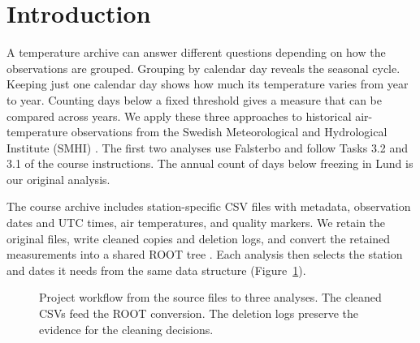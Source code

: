 \section{Introduction}
A temperature archive can answer different questions depending on how the observations are grouped. Grouping by calendar day reveals the seasonal cycle. Keeping just one calendar day shows how much its temperature varies from year to year. Counting days below a fixed threshold gives a measure that can be compared across years. We apply these three approaches to historical air-temperature observations from the Swedish Meteorological and Hydrological Institute (SMHI) \cite{smhi,instructions}. The first two analyses use Falsterbo and follow Tasks 3.2 and 3.1 of the course instructions. The annual count of days below freezing in Lund is our original analysis.

The course archive includes station-specific CSV files with metadata, observation dates and UTC times, air temperatures, and quality markers. We retain the original files, write cleaned copies and deletion logs, and convert the retained measurements into a shared ROOT tree \cite{root,repo}. Each analysis then selects the station and dates it needs from the same data structure (Figure~\ref{fig:workflow}).

\begin{figure}[htbp]
\centering
{}
\caption{Project workflow from the source files to three analyses. The cleaned CSVs feed the ROOT conversion. The deletion logs preserve the evidence for the cleaning decisions.}
\label{fig:workflow}
\end{figure}

